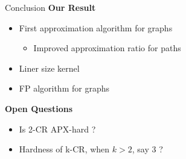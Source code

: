 \begin{frame}{Conclusion}
\textbf{Our Result}
	\pause
	\begin{itemize}
	\item First approximation algorithm for graphs
		\begin{itemize}
		\pause\item
		Improved approximation ratio for paths 
		\end{itemize}
	
	\pause\item
	Liner size kernel
	
	\pause\item
	FP algorithm for graphs
	
	\end{itemize}

\textbf{Open Questions}
	\begin{itemize}
	
	\pause\item
	Is 2-CR APX-hard ?
	
	\pause\item
	Hardness of k-CR, when $k > 2$, say 3 ?
	
	\end{itemize}

\end{frame}